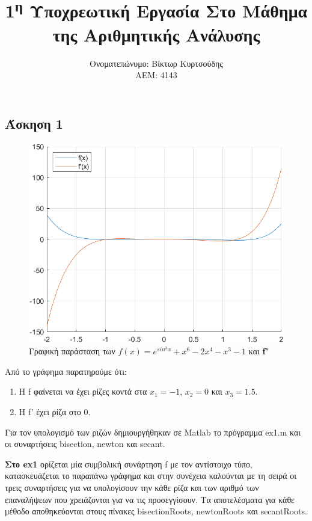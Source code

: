 \documentclass[a4paper,11pt]{article}
\title{1\textsuperscript{η} Υποχρεωτική Εργασία Στο Μάθημα της Αριθμητικής Ανάλυσης}
\author{Ονοματεπώνυμο: Βίκτωρ Κυρτσούδης \\ ΑΕΜ: 4143}
\date{}
\begin{document}
\maketitle

\begin{flushleft}
\boldmath

\section*{Άσκηση 1}
\begin{figure}[h]
    \caption*{Γραφική παράσταση των $f(x) = e^{sin^3x}+x^6-2x^4-x^3-1$ και \textbf{f'}}
    \includegraphics[width=\textwidth]{ex1plot.png}
\end{figure}

Από το γράφημα παρατηρούμε ότι:
\begin{enumerate}
    \item Η f φαίνεται να έχει ρίζες κοντά στα $x_1=-1$, $x_2=0$ και $x_3=1.5$.
    \item Η f' έχει ρίζα στο 0.
\end{enumerate}

Για τον υπολογισμό των ριζών δημιουργήθηκαν σε Matlab το πρόγραμμα ex1.m και οι συναρτήσεις bisection, newton και secant.

\textbf{Στο ex1} ορίζεται μία συμβολική συνάρτηση f με τον αντίστοιχο τύπο, κατασκευάζεται το παραπάνω γράφημα και στην συνέχεια καλούνται με τη σειρά οι τρεις συναρτήσεις για να υπολογίσουν την κάθε ρίζα και των αριθμό των επαναλήψεων που χρειάζονται για να τις προσεγγίσουν. Τα αποτελέσματα για κάθε μέθοδο αποθηκεύονται στους πίνακες bisectionRoots, newtonRoots και secantRoots.
\linebreak


\end{flushleft}
\end{document}
